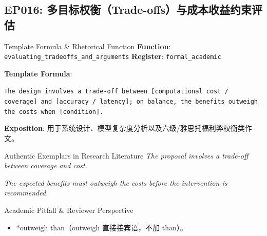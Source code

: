 \subsection{EP016: 多目标权衡（Trade-offs）与成本收益约束评估}\label{sec:ep:EP016}
\begin{ConceptBox}{Template Formula \& Rhetorical Function}
\textbf{Function}: \texttt{evaluating\_tradeoffs\_and\_arguments} \quad \textbf{Register}: \texttt{formal\_academic}\par\vspace{3pt}
\textbf{Template Formula}:\par\noindent\texttt{The design involves a trade-off between [computational cost / coverage] and [accuracy / latency]; on balance, the benefits outweigh the costs when [condition].}\par\vspace{4pt}
\textbf{Exposition}: 用于系统设计、模型复杂度分析以及六级/雅思托福利弊权衡类作文。
\end{ConceptBox}
\begin{ExampleBox}{Authentic Exemplars in Research Literature}
\textit{The proposal involves a trade-off between coverage and cost.}\par\vspace{2pt}
\textit{The expected benefits must outweigh the costs before the intervention is recommended.}\par\vspace{2pt}
\end{ExampleBox}
\begin{TipBox}{Academic Pitfall \& Reviewer Perspective}
\begin{itemize}[leftmargin=1.5em, itemsep=1pt]
  \item *outweigh than（outweigh 直接接宾语，不加 than）。
\end{itemize}
\end{TipBox}
\vspace{6pt}
